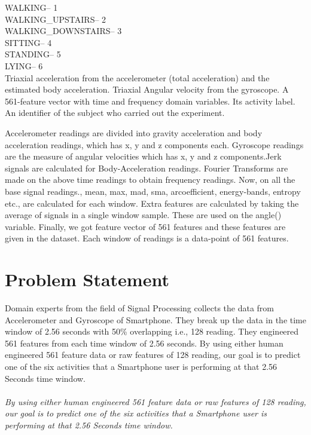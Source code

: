 \documentclass[12pt,conference]{IEEEtran}
\begin{document}
WALKING-- 1 \\
WALKING\_UPSTAIRS-- 2 \\
WALKING\_DOWNSTAIRS-- 3 \\
SITTING-- 4 \\
STANDING-- 5 \\
LYING-- 6 \\

Triaxial acceleration from the accelerometer (total acceleration) and the estimated body acceleration.
Triaxial Angular velocity from the gyroscope.
A 561-feature vector with time and frequency domain variables. Its activity label. An identifier of the subject who carried out the experiment.

Accelerometer readings are divided into gravity acceleration and body acceleration readings, which has x, y and z components each. Gyroscope readings are the measure of angular velocities which has x, y and z components.Jerk signals are calculated for Body-Acceleration readings.
Fourier Transforms are made on the above time readings to obtain frequency readings.
Now, on all the base signal readings., mean, max, mad, sma, arcoefficient, energy-bands, entropy etc., are calculated for each window.
Extra features are calculated by taking the average of signals in a single window sample. These are used on the angle() variable.
Finally, we got feature vector of 561 features and these features are given in the dataset.
Each window of readings is a data-point of 561 features.


\section{
\textbf{Problem Statement}
}

Domain experts from the field of Signal Processing collects the data from Accelerometer and Gyroscope of Smartphone. They break up the data in the time window of 2.56 seconds with 50\% overlapping i.e., 128 reading. They engineered 561 features from each time window of 2.56 seconds. By using either human engineered 561 feature data or raw features of 128 reading, our goal is to predict one of the six activities that a Smartphone user is performing at that 2.56 Seconds time window.
\newline \\
\\
\emph{By using either human engineered 561 feature data or raw features of 128 reading, our goal is to predict one of the six activities that a Smartphone user is performing at that 2.56 Seconds time window.}
\end{document}
